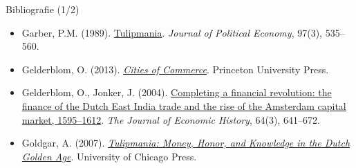 \begin{frame}{Bibliografie (1/2)}
\begin{itemize}
    \item Garber, P.M. (1989). \href{https://doi.org/10.1086/261615}{Tulipmania}. \emph{Journal of Political Economy}, 97(3), 535--560.
    \item Gelderblom, O. (2013). \href{https://doi.org/10.23943/princeton/9780691142883.001.0001}{\emph{Cities of Commerce}}. Princeton University Press.
    \item Gelderblom, O., Jonker, J. (2004). \href{https://doi.org/10.1017/S002205070400292X}{Completing a financial revolution: the finance of the Dutch East India trade and the rise of the Amsterdam capital market, 1595--1612}. \emph{The Journal of Economic History}, 64(3), 641--672.
    \item Goldgar, A. (2007). \href{https://doi.org/10.7208/chicago/9780226301303.001.0001}{\emph{Tulipmania: Money, Honor, and Knowledge in the Dutch Golden Age}}. University of Chicago Press.
\end{itemize}
\end{frame}

